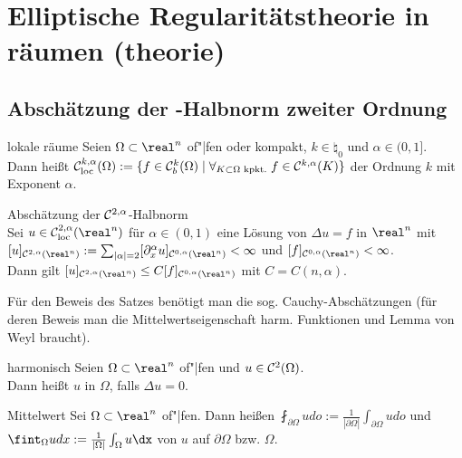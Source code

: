 \section{%
    Elliptische Regularitätstheorie in räumen (theorie)%
}

\subsection{%
    Abschätzung der -Halbnorm zweiter Ordnung%
}

\begin{Def}{lokale räume}
    Seien $\Omega \subset \real^n$ of"|fen oder kompakt, $k \in \natural_0$ und
    $\alpha \in (0, 1]$.\\
    Dann heißt $\mathcal{C}^{k,\alpha}_{\text{loc}}(\Omega) := \{f \in \mathcal{C}^k_b(\Omega) \;|\;
    \forall_{K \subset \Omega \text{ kpkt.}}\; f \in \mathcal{C}^{k,\alpha}(K)\}$
     der Ordnung $k$ mit Exponent $\alpha$.
\end{Def}

\begin{Satz}{Abschätzung der $\mathcal{C}^{2,\alpha}$-Halbnorm}\\
    Sei $u \in \C^{2,\alpha}_\loc(\real^n)$ für $\alpha \in (0, 1)$ eine Lösung von
    $\Delta u = f$ in $\real^n$ mit\\
    $[u]_{\C^{2,\alpha}(\real^n)} :=
    \sum_{|\alpha|=2} [\partial_x^\alpha u]_{\C^{0,\alpha}(\real^n)} < \infty$ und
    $[f]_{\C^{0,\alpha}(\real^n)} < \infty$.\\
    Dann gilt $[u]_{\C^{2,\alpha}(\real^n)} \le C [f]_{\C^{0,\alpha}(\real^n)}$
    mit $C = C(n, \alpha)$.
\end{Satz}

\linie

\begin{Bem}
    Für den Beweis des Satzes benötigt man die sog. Cauchy-Abschätzungen
    (für deren Beweis man die Mittelwertseigenschaft harm. Funktionen
    und Lemma von Weyl braucht).
\end{Bem}

\begin{Def}{harmonisch}
    Seien $\Omega \subset \real^n$ of"|fen und $u \in \mathcal{C}^2(\Omega)$.\\
    Dann heißt $u$  in $\Omega$, falls $\Delta u = 0$.
\end{Def}

\begin{Def}{Mittelwert}
    Sei $\Omega \subset \real^n$ of"|fen.
    Dann heißen
    $\fint_{\partial\Omega} udo := \frac{1}{|\partial\Omega|} \int_{\partial\Omega} udo$ und
    $\fint_\Omega udx := \frac{1}{|\Omega|} \int_\Omega u\dx$  von $u$ auf
    $\partial\Omega$ bzw. $\Omega$.
\end{Def}

